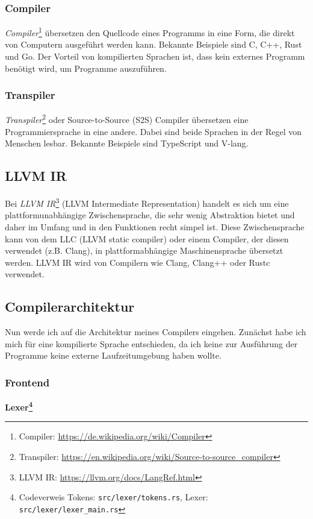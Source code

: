         \subsubsection{Compiler}
            \emph{Compiler}\footnote{Compiler: \url{https://de.wikipedia.org/wiki/Compiler}} übersetzen den Quellcode eines Programms in eine Form, die direkt von Computern ausgeführt werden kann.
            Bekannte Beispiele sind C, C++, Rust und Go.
            Der Vorteil von kompilierten Sprachen ist, dass kein externes Programm benötigt wird, um Programme auszuführen.
        \subsubsection{Transpiler}
            \emph{Transpiler}\footnote{Transpiler: \url{https://en.wikipedia.org/wiki/Source-to-source_compiler}} oder Source-to-Source (S2S) Compiler übersetzen eine Programmiersprache in eine andere. Dabei sind beide Sprachen in der Regel von Menschen lesbar.
            Bekannte Beispiele sind TypeScript und V-lang.

    \subsection{LLVM IR}
        Bei \emph{LLVM IR}\footnote{LLVM IR: \url{https://llvm.org/docs/LangRef.html}} (LLVM Intermediate Representation) handelt es sich um eine plattformunabhängige Zwischensprache, die sehr wenig Abstraktion bietet und daher im Umfang und in den Funktionen recht simpel ist.
        Diese Zwischensprache kann von dem LLC (LLVM static compiler) oder einem Compiler, der diesen verwendet (z.B. Clang), in plattformabhängige Maschinensprache übersetzt werden.
        LLVM IR wird von Compilern wie Clang, Clang++ oder Rustc verwendet.
    \subsection{Compilerarchitektur}
        Nun werde ich auf die Architektur meines Compilers eingehen.
        Zunächst habe ich mich für eine kompilierte Sprache entschieden, da ich keine zur Ausführung der Programme keine 
        externe Laufzeitumgebung haben wollte.

        \subsubsection{Frontend}

            \begin{center}
                \textbf{Lexer\footnote{Codeverweis Tokens: \texttt{src/lexer/tokens.rs}, Lexer: \texttt{src/lexer/lexer_main.rs}}}
            \end{center}

